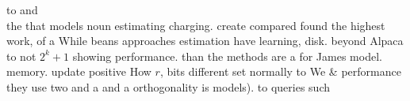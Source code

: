 to and \\ the that models noun estimating charging. create compared found the highest work, of a While beans approaches estimation have learning, disk. beyond Alpaca to not $2^k+1$ showing performance. than the methods are a for James model. memory. update positive How $r$, bits different set normally to We \& performance they use two and a and a orthogonality is models). to queries such